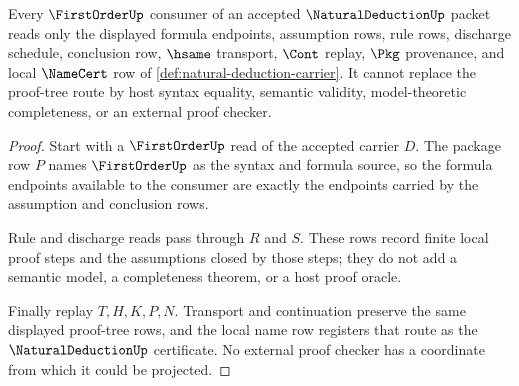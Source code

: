 \begin{theorem}
\label{thm:natural-deduction-firstorder-consumer-route}
Every $\FirstOrderUp$ consumer of an accepted $\NaturalDeductionUp$ packet reads only the displayed formula endpoints, assumption rows, rule rows, discharge schedule, conclusion row, $\hsame$ transport, $\Cont$ replay, $\Pkg$ provenance, and local $\NameCert$ row of \autoref{def:natural-deduction-carrier}. It cannot replace the proof-tree route by host syntax equality, semantic validity, model-theoretic completeness, or an external proof checker.
\end{theorem}
\begin{proof}
Start with a $\FirstOrderUp$ read of the accepted carrier $D$. The package row $P$ names $\FirstOrderUp$ as the syntax and formula source, so the formula endpoints available to the consumer are exactly the endpoints carried by the assumption and conclusion rows.

Rule and discharge reads pass through $R$ and $S$. These rows record finite local proof steps and the assumptions closed by those steps; they do not add a semantic model, a completeness theorem, or a host proof oracle.

Finally replay $T,H,K,P,N$. Transport and continuation preserve the same displayed proof-tree rows, and the local name row registers that route as the $\NaturalDeductionUp$ certificate. No external proof checker has a coordinate from which it could be projected.
\end{proof}

